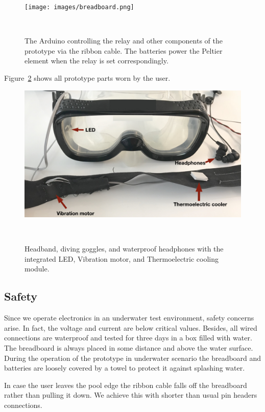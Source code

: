 \begin{figure}
	\texttt{[image: images/breadboard.png]}
	\caption{The Arduino controlling the relay and other components of the prototype via the ribbon cable. The batteries power the Peltier element when the relay is set correspondingly.}~\label{fig:breadboard}
\end{figure}


Figure~\ref{fig:studysetupcut} shows all prototype parts worn by the user.
 
\begin{figure}
	\includegraphics[width= \textwidth]{images/studysetupcut.png}
	\caption{Headband, diving goggles, and waterproof headphones with the integrated LED, Vibration motor, and Thermoelectric cooling module.}~\label{fig:studysetupcut}
\end{figure}


\subsection{Safety}

Since we operate electronics in an underwater test environment, safety concerns arise.
In fact, the voltage and current are below critical values.
Besides, all  wired connections are waterproof and tested for three days in a box filled with water.
The breadboard is always placed in some distance and above the water surface.
During the operation of the prototype in underwater scenario the breadboard and batteries are loosely covered by a towel to protect it against splashing water.

In case the user leaves the pool edge the ribbon cable falls off the breadboard rather than pulling it down. 
We achieve this with shorter than usual pin headers connections.

